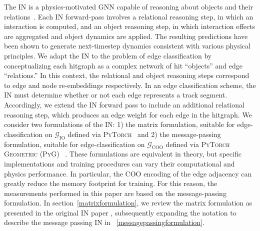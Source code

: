 \documentclass[twocolumn]{svjour3}
\begin{document}
The IN is a physics-motivated GNN capable of reasoning about objects and their relations~\cite{IN}. 
Each IN forward-pass involves a relational reasoning step, in which an interaction is computed, and an object reasoning step, in which interaction effects are aggregated and object dynamics are applied. 
The resulting predictions have been shown to generate next-timestep dynamics consistent with various physical principles. 
We adapt the IN to the problem of edge classification by conceptualizing each hitgraph as a complex network of hit ``objects'' and edge ``relations.''
In this context, the relational and object reasoning steps correspond to edge and node re-embeddings respectively. 
In an edge classification scheme, the IN must determine whether or not each edge represents a track segment. 
Accordingly, we extend the IN forward pass to include an additional relational reasoning step, which produces an edge weight for each edge in the hitgraph. 
We consider two formulations of the IN: 1) the matrix formulation, suitable for edge-classification on $\mathcal{G}_\mathrm{IO}$ defined via \textsc{PyTorch}~\cite{pytorch} and 2) the message-passing formulation, suitable for edge-classification on $\mathcal{G}_\mathrm{COO}$ defined via \textsc{PyTorch Geometric} (\textsc{PyG}) ~\cite{fey2019fast}. 
These formulations are equivalent in theory, but specific implementations and training procedures can vary their computational and physics performance. 
In particular, the COO encoding of the edge adjacency can greatly reduce the memory footprint for training. 
For this reason, the measurements performed in this paper are based on the message-passing formulation. 
In section~\ref{matrixformulation}, we review the matrix formulation as presented in the original IN paper \cite{IN}, subsequently expanding the notation to describe the message passing IN in ~\ref{messagepassingformulation}. 
\end{document}

